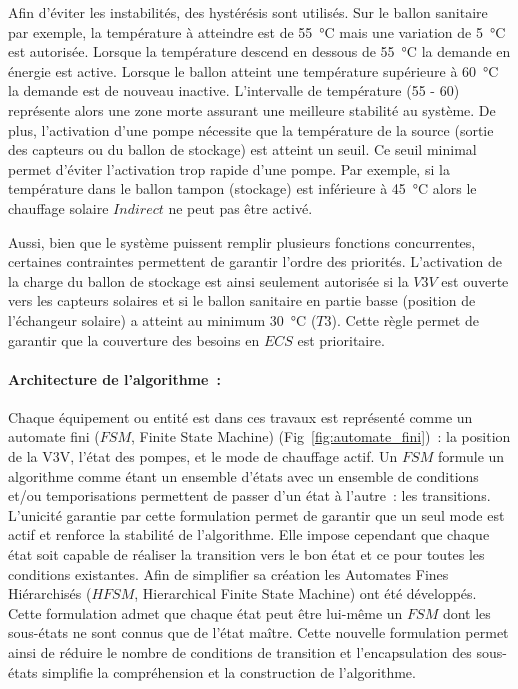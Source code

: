Afin d’éviter les instabilités, des hystérésis sont utilisés. Sur le ballon sanitaire par
exemple, la température à atteindre est de \SI{55}{\celsius} mais une variation de
\SI{5}{\celsius} est autorisée. Lorsque la température descend en dessous de
\SI{55}{\celsius} la demande en énergie est active. Lorsque le ballon atteint une
température supérieure à \SI{60}{\celsius} la demande est de nouveau inactive.
L’intervalle de température (55 - 60) représente alors une zone morte assurant une
meilleure stabilité au système.
De plus, l’activation d’une pompe nécessite que la température de la source (sortie des
capteurs ou du ballon de stockage) est atteint un seuil. Ce seuil minimal permet d’éviter
l’activation trop rapide d’une pompe. Par exemple, si la température dans le ballon tampon
(stockage) est inférieure à \SI{45}{\celsius} alors le chauffage solaire $Indirect$ ne
peut pas être activé.

Aussi, bien que le système puissent remplir plusieurs fonctions
concurrentes, certaines contraintes permettent de garantir l’ordre
des priorités. L’activation de la charge du ballon de stockage est ainsi seulement autorisée si la
$V3V$ est ouverte vers les capteurs solaires et si le ballon sanitaire en partie
basse (position de l’échangeur solaire) a atteint au minimum \SI{30}{\celsius} ($T3$). Cette
règle permet de garantir que la couverture des besoins en $ECS$ est prioritaire.

\paragraph{Architecture de l’algorithme~:} %
\label{par:architecture_de_l_algorithme}
Chaque équipement ou entité est dans ces travaux est représenté comme un automate fini
($FSM$, Finite State Machine) (Fig~\ref{fig:automate_fini})~: la position de la V3V,
l’état des pompes, et le mode de chauffage actif. Un $FSM$ formule un algorithme comme
étant un ensemble d’états avec un ensemble de conditions et/ou temporisations permettent de passer
d’un état à l’autre~: les transitions. L’unicité garantie par cette formulation permet de
garantir que un seul mode est actif et renforce la stabilité de l’algorithme. Elle impose
cependant que chaque état soit capable de réaliser la transition vers le bon état et ce
pour toutes les conditions existantes. Afin de simplifier sa création les Automates Fines
Hiérarchisés ($HFSM$, Hierarchical Finite State Machine) ont été développés. Cette
formulation admet que chaque état peut être lui-même un $FSM$ dont les sous-états ne sont
connus que de l’état maître. Cette nouvelle formulation permet ainsi de réduire le nombre
de conditions de transition et l’encapsulation des sous-états simplifie la compréhension
et la construction de l’algorithme.


